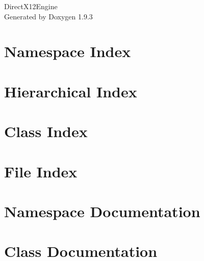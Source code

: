 \documentclass[twoside]{book}
\newcommand{\+}{\discretionary{\mbox{\scriptsize$\hookleftarrow$}}{}{}}
\newcommand{\clearemptydoublepage}{%
    \newpage{\pagestyle{empty}\cleardoublepage}%
  }
\begin{document}
  \raggedbottom
    \hypersetup{pageanchor=false,
                bookmarksnumbered=true,
                pdfencoding=unicode
               }
  \begin{titlepage}
  \vspace*{7cm}
  \begin{center}%
  {\Large Direct\+X12\+Engine}\\
  \vspace*{1cm}
  {\large Generated by Doxygen 1.9.3}\\
  \end{center}
  \end{titlepage}
  \clearemptydoublepage
  \tableofcontents
  \clearemptydoublepage
  \hypersetup{pageanchor=true}
\chapter{Namespace Index}

\chapter{Hierarchical Index}

\chapter{Class Index}

\chapter{File Index}

\chapter{Namespace Documentation}

\chapter{Class Documentation}






























\end{document}
